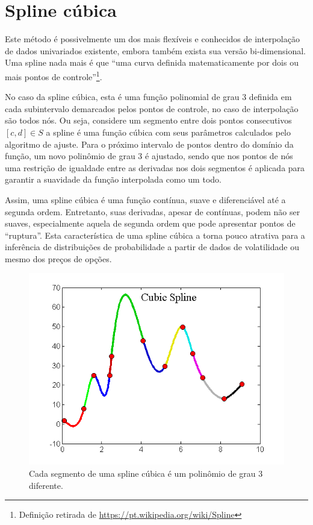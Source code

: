 \documentclass[]{book}
\let\rmarkdownfootnote\footnote%
\def\footnote{\protect\rmarkdownfootnote}
\begin{document}
\section{Spline cúbica}\label{spline-cubica}

Este método é possivelmente um dos mais flexíveis e conhecidos de
interpolação de dados univariados existente, embora também exista sua
versão bi-dimensional. Uma spline nada mais é que ``uma curva definida
matematicamente por dois ou mais pontos de controle''\footnote{Definição
  retirada de \url{https://pt.wikipedia.org/wiki/Spline}}.

No caso da spline cúbica, esta é uma função polinomial de grau 3
definida em cada subintervalo demarcados pelos pontos de controle, no
caso de interpolação são todos nós. Ou seja, considere um segmento entre
dois pontos consecutivos \([c, d]\in S\) a spline é uma função cúbica
com seus parâmetros calculados pelo algoritmo de ajuste. Para o próximo
intervalo de pontos dentro do domínio da função, um novo polinômio de
grau 3 é ajustado, sendo que nos pontos de nós uma restrição de
igualdade entre as derivadas nos dois segmentos é aplicada para garantir
a suavidade da função interpolada como um todo.

Assim, uma spline cúbica é uma função contínua, suave e diferenciável
até a segunda ordem. Entretanto, suas derivadas, apesar de contínuas,
podem não ser suaves, especialmente aquela de segunda ordem que pode
apresentar pontos de ``ruptura''. Esta característica de uma spline
cúbica a torna pouco atrativa para a inferência de distribuições de
probabilidade a partir de dados de volatilidade ou mesmo dos preços de
opções.

\begin{figure}
\centering
\includegraphics{./images/cubic_spline.png}
\caption{\label{fig:cubic-spline}Cada segmento de uma spline cúbica é um
polinômio de grau 3 diferente.}
\end{figure}
\end{document}
